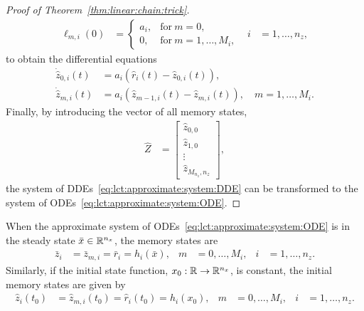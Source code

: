 \begin{proof}[Proof of Theorem~\ref{thm:linear:chain:trick}]
\begin{align}
		\ell_{m, i}(0) &=
		\begin{cases}
			a_i, & \text{for}~m = 0, \\
			0,   & \text{for}~m = 1, \ldots, M_i,
		\end{cases} & i &= 1, \ldots, n_z,
	\end{align}
	to obtain the differential equations
	\begin{subequations}
		\begin{align}
			\dot{\hat z}_{0, i}(t)
			&= a_i (\hat r_i(t) - \hat z_{0, i}(t)), \\
			\dot{\hat z}_{m, i}(t)
			&= a_i (\hat z_{m-1, i}(t) - \hat z_{m, i}(t)), \quad m = 1, \ldots, M_i.
		\end{align}
	\end{subequations}
	Finally, by introducing the vector of all memory states,
	\begin{align}
		\hat Z &=
		\begin{bmatrix}
			\hat z_{0, 0} \\
			\hat z_{1, 0} \\
			\vdots \\
			\hat z_{M_{n_z}, n_z}
		\end{bmatrix},
	\end{align}
	the system of DDEs~\eqref{eq:lct:approximate:system:DDE} can be transformed to the system of ODEs~\eqref{eq:lct:approximate:system:ODE}.
\end{proof}
%
\begin{corollary}\label{rem:constant:initial:function}
	When the approximate system of ODEs~\eqref{eq:lct:approximate:system:ODE} is in the steady state $\bar x \in \mathbb{R}^{n_x}$, the memory states are
	\begin{align}
		\bar z_i &= \bar z_{m, i} = \bar r_i = h_i(\bar x), & m &= 0, \ldots, M_i, & i &= 1, \ldots, n_z.
	\end{align}
	Similarly, if the initial state function, $x_0: \mathbb{R} \rightarrow \mathbb{R}^{n_x}$, is constant, the initial memory states are given by
	\begin{align}
		\hat z_i(t_0) &= \hat z_{m, i}(t_0) = \hat r_i(t_0) = h_i(x_0), & m &= 0, \ldots, M_i, & i &= 1, \ldots, n_z.
	\end{align}
\end{corollary}
%
